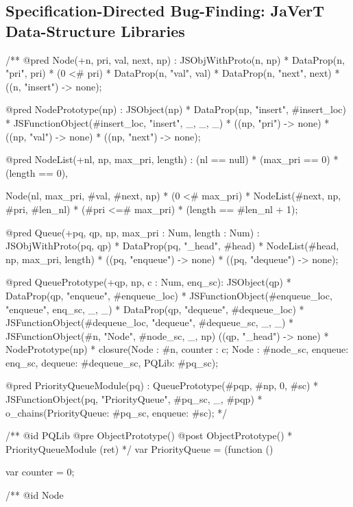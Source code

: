 \subsection{Specification-Directed Bug-Finding: JaVerT Data-Structure Libraries}



\begin{lstjshere}
/**
  @pred Node(+n, pri, val, next, np) :
      JSObjWithProto(n, np) * DataProp(n, "pri",  pri) * 
      (0 <# pri) * DataProp(n, "val",  val) *
      DataProp(n, "next", next) * ((n, "insert") -> none);
	
  @pred NodePrototype(np) :
      JSObject(np) * DataProp(np, "insert", #insert_loc) *
      JSFunctionObject(#insert_loc, "insert", _, _, _) *
      ((np, "pri") -> none) * ((np, "val") -> none) * 
      ((np, "next") -> none);
	
  @pred NodeList(+nl, np, max_pri, length) :
      (nl == null) * (max_pri == 0) * (length == 0),
      
      Node(nl, max_pri, #val, #next, np) * (0 <# max_pri) *
      NodeList(#next, np, #pri, #len_nl) * (#pri <=# max_pri) *
      (length == #len_nl + 1);
	
	
  @pred Queue(+pq, qp, np, max_pri : Num, length : Num) :
      JSObjWithProto(pq, qp) * DataProp(pq, "_head",  #head) *
      NodeList(#head, np, max_pri, length) * 
      ((pq, "enqueue") -> none) * ((pq, "dequeue") -> none);
	
	
  @pred QueuePrototype(+qp, np, c : Num, enq_sc):
      JSObject(qp) * DataProp(qp, "enqueue", #enqueue_loc) * 
      JSFunctionObject(#enqueue_loc, "enqueue", enq_sc, _, _) *
      DataProp(qp, "dequeue", #dequeue_loc) * 
      JSFunctionObject(#dequeue_loc, "dequeue", #dequeue_sc, _, _) *
      JSFunctionObject(#n, "Node", #node_sc, _, np)
      ((qp, "_head") -> none) * NodePrototype(np) * 
      closure(Node : #n, counter : c; Node : #node_sc, 
        enqueue: enq_sc, dequeue: #dequeue_sc, PQLib: #pq_sc);
	
  @pred PriorityQueueModule(pq) :
      QueuePrototype(#pqp, #np, 0, #sc) *
      JSFunctionObject(pq, "PriorityQueue", #pq_sc, _, #pqp) *
      o_chains(PriorityQueue: #pq_sc, enqueue: #sc);
*/

/** 
  @id PQLib
  @pre  ObjectPrototype()
  @post ObjectPrototype() * PriorityQueueModule (ret)
*/
var PriorityQueue = (function () {

  var counter = 0;

  /**
    @id  Node

}
\end{lstjshere}
